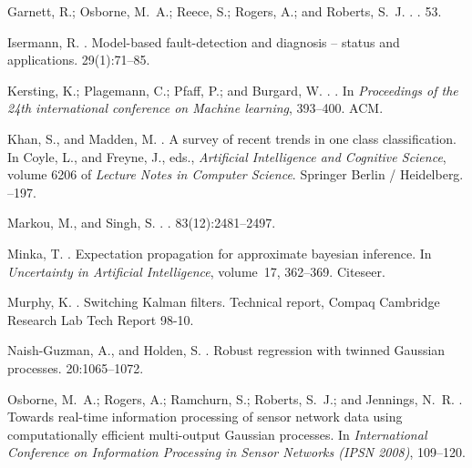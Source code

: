 \documentclass[letterpaper]{article}
\begin{document}
\begin{thebibliography}{}
Garnett, R.; Osborne, M.~A.; Reece, S.; Rogers, A.; and Roberts, S.~J.
.
.
 53.

Isermann, R.
.
\newblock Model-based fault-detection and diagnosis -- status and applications.
 29(1):71--85.

Kersting, K.; Plagemann, C.; Pfaff, P.; and Burgard, W.
.
.
\newblock In {\em Proceedings of the 24th international conference on Machine
  learning},  393--400.
\newblock ACM.

Khan, S., and Madden, M.
.
\newblock A survey of recent trends in one class classification.
\newblock In Coyle, L., and Freyne, J., eds., {\em Artificial Intelligence and
  Cognitive Science}, volume 6206 of {\em Lecture Notes in Computer Science}.
  Springer Berlin / Heidelberg.
--197.

Markou, M., and Singh, S.
.
.
 83(12):2481--2497.

Minka, T.
.
\newblock Expectation propagation for approximate bayesian inference.
\newblock In {\em Uncertainty in Artificial Intelligence}, volume~17,
  362--369.
\newblock Citeseer.

Murphy, K.
.
\newblock Switching {K}alman filters.
\newblock Technical report, {Compaq Cambridge Research Lab Tech Report 98-10}.

Naish-Guzman, A., and Holden, S.
.
\newblock Robust regression with twinned {G}aussian processes.
  20:1065--1072.

Osborne, M.~A.; Rogers, A.; Ramchurn, S.; Roberts, S.~J.; and Jennings, N.~R.
.
\newblock Towards real-time information processing of sensor network data using
  computationally efficient multi-output {G}aussian processes.
\newblock In {\em International Conference on Information Processing in Sensor
  Networks (IPSN 2008)},  109--120.


\end{thebibliography}
\end{document}
